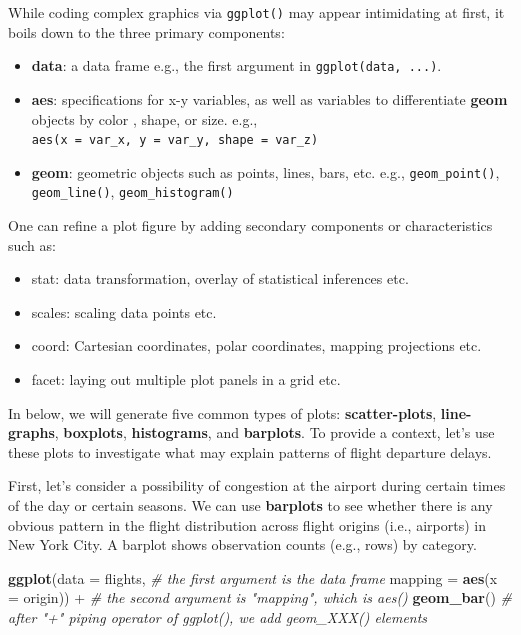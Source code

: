 \documentclass[]{book}
\newenvironment{Shaded}{\begin{snugshade}}{\end{snugshade}}
\newcommand{\KeywordTok}[1]{\textcolor[rgb]{0.13,0.29,0.53}{\textbf{{#1}}}}
\newcommand{\DataTypeTok}[1]{\textcolor[rgb]{0.13,0.29,0.53}{{#1}}}
\newcommand{\StringTok}[1]{\textcolor[rgb]{0.31,0.60,0.02}{{#1}}}
\newcommand{\CommentTok}[1]{\textcolor[rgb]{0.56,0.35,0.01}{\textit{{#1}}}}
\newcommand{\NormalTok}[1]{{#1}}
\theoremstyle{definition}
\theoremstyle{definition}
\theoremstyle{remark}
\begin{document}
While coding complex graphics via \texttt{ggplot()} may appear
intimidating at first, it boils down to the three primary components:

\begin{itemize}
\item
  \textbf{data}: a data frame e.g., the first argument in
  \texttt{ggplot(data,\ ...)}.
\item
  \textbf{aes}: specifications for x-y variables, as well as variables
  to differentiate \textbf{geom} objects by color , shape, or size.
  e.g., \texttt{aes(x\ =\ var\_x,\ y\ =\ var\_y,\ shape\ =\ var\_z)}
\item
  \textbf{geom}: geometric objects such as points, lines, bars, etc.
  e.g., \texttt{geom\_point()}, \texttt{geom\_line()},
  \texttt{geom\_histogram()}
\end{itemize}

One can refine a plot figure by adding secondary components or
characteristics such as:

\begin{itemize}
\item
  stat: data transformation, overlay of statistical inferences etc.
\item
  scales: scaling data points etc.
\item
  coord: Cartesian coordinates, polar coordinates, mapping projections
  etc.
\item
  facet: laying out multiple plot panels in a grid etc.
\end{itemize}

In below, we will generate five common types of plots:
\textbf{scatter-plots}, \textbf{line-graphs}, \textbf{boxplots},
\textbf{histograms}, and \textbf{barplots}. To provide a context, let's
use these plots to investigate what may explain patterns of flight
departure delays.

First, let's consider a possibility of congestion at the airport during
certain times of the day or certain seasons. We can use
\textbf{barplots} to see whether there is any obvious pattern in the
flight distribution across flight origins (i.e., airports) in New York
City. A barplot shows observation counts (e.g., rows) by category.

\begin{Shaded}
\begin{Highlighting}[]
\KeywordTok{ggplot}\NormalTok{(}\DataTypeTok{data =} \NormalTok{flights,  }\CommentTok{# the first argument is the data frame}
       \DataTypeTok{mapping =} \KeywordTok{aes}\NormalTok{(}\DataTypeTok{x =} \NormalTok{origin)) +}\StringTok{   }\CommentTok{# the second argument is "mapping", which is aes()   }
\StringTok{  }\KeywordTok{geom_bar}\NormalTok{()  }\CommentTok{#  after "+" piping operator of ggplot(), we add geom_XXX() elements }
\end{Highlighting}
\end{Shaded}
\end{document}
